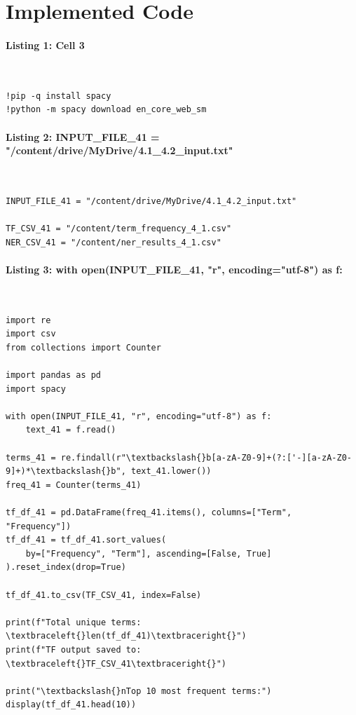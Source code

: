 \documentclass[12pt,a4paper,oneside]{report}
\begin{document}
\section{Implemented Code}
\paragraph{Listing 1: Cell 3}\mbox{}\\[-1ex]
\begin{Verbatim}[commandchars=\\\{\},breaklines=true,breakanywhere=true,fontsize=\scriptsize,frame=leftline,framesep=2mm,rulecolor=\color{gray}]
!pip -q install spacy
!python -m spacy download en_core_web_sm
\end{Verbatim}
\paragraph{Listing 2: INPUT\_FILE\_41 = "/content/drive/MyDrive/4.1\_4.2\_input.txt"}\mbox{}\\[-1ex]
\begin{Verbatim}[commandchars=\\\{\},breaklines=true,breakanywhere=true,fontsize=\scriptsize,frame=leftline,framesep=2mm,rulecolor=\color{gray}]
INPUT_FILE_41 = "/content/drive/MyDrive/4.1_4.2_input.txt"

TF_CSV_41 = "/content/term_frequency_4_1.csv"
NER_CSV_41 = "/content/ner_results_4_1.csv"
\end{Verbatim}
\paragraph{Listing 3: with open(INPUT\_FILE\_41, "r", encoding="utf-8") as f:}\mbox{}\\[-1ex]
\begin{Verbatim}[commandchars=\\\{\},breaklines=true,breakanywhere=true,fontsize=\scriptsize,frame=leftline,framesep=2mm,rulecolor=\color{gray}]
import re
import csv
from collections import Counter

import pandas as pd
import spacy

with open(INPUT_FILE_41, "r", encoding="utf-8") as f:
    text_41 = f.read()

terms_41 = re.findall(r"\textbackslash{}b[a-zA-Z0-9]+(?:['-][a-zA-Z0-9]+)*\textbackslash{}b", text_41.lower())
freq_41 = Counter(terms_41)

tf_df_41 = pd.DataFrame(freq_41.items(), columns=["Term", "Frequency"])
tf_df_41 = tf_df_41.sort_values(
    by=["Frequency", "Term"], ascending=[False, True]
).reset_index(drop=True)

tf_df_41.to_csv(TF_CSV_41, index=False)

print(f"Total unique terms: \textbraceleft{}len(tf_df_41)\textbraceright{}")
print(f"TF output saved to: \textbraceleft{}TF_CSV_41\textbraceright{}")

print("\textbackslash{}nTop 10 most frequent terms:")
display(tf_df_41.head(10))
\end{Verbatim}
\end{document}
